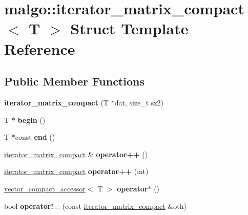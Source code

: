 \hypertarget{structmalgo_1_1iterator__matrix__compact}{}\section{malgo\+:\+:iterator\+\_\+matrix\+\_\+compact$<$ T $>$ Struct Template Reference}
\label{structmalgo_1_1iterator__matrix__compact}
\subsection*{Public Member Functions}
\begin{DoxyCompactItemize}
\item 
{\bfseries iterator\+\_\+matrix\+\_\+compact} (T $\ast$dat, size\+\_\+t sz2)\hypertarget{structmalgo_1_1iterator__matrix__compact_a6ecbcfb49db70543caf35c4c3c5786a9}{}\label{structmalgo_1_1iterator__matrix__compact_a6ecbcfb49db70543caf35c4c3c5786a9}

\item 
T $\ast$ {\bfseries begin} ()\hypertarget{structmalgo_1_1iterator__matrix__compact_af4232acbbc9790f3f0df8c0673c4f4dc}{}\label{structmalgo_1_1iterator__matrix__compact_af4232acbbc9790f3f0df8c0673c4f4dc}

\item 
T $\ast$const {\bfseries end} ()\hypertarget{structmalgo_1_1iterator__matrix__compact_ac4c395511c52cd471c2c17eddaa2f19f}{}\label{structmalgo_1_1iterator__matrix__compact_ac4c395511c52cd471c2c17eddaa2f19f}

\item 
\hyperlink{structmalgo_1_1iterator__matrix__compact}{iterator\+\_\+matrix\+\_\+compact} \& {\bfseries operator++} ()\hypertarget{structmalgo_1_1iterator__matrix__compact_aaa6c14c1501bd003315524564ced7c8c}{}\label{structmalgo_1_1iterator__matrix__compact_aaa6c14c1501bd003315524564ced7c8c}

\item 
\hyperlink{structmalgo_1_1iterator__matrix__compact}{iterator\+\_\+matrix\+\_\+compact} {\bfseries operator++} (int)\hypertarget{structmalgo_1_1iterator__matrix__compact_aeadd747858bf5975190be1d65510fdb7}{}\label{structmalgo_1_1iterator__matrix__compact_aeadd747858bf5975190be1d65510fdb7}

\item 
\hyperlink{classmalgo_1_1vector__compact__accessor}{vector\+\_\+compact\+\_\+accessor}$<$ T $>$ {\bfseries operator$\ast$} ()\hypertarget{structmalgo_1_1iterator__matrix__compact_a09a80325b2929e86e0768728fea579a6}{}\label{structmalgo_1_1iterator__matrix__compact_a09a80325b2929e86e0768728fea579a6}

\item 
bool {\bfseries operator!=} (const \hyperlink{structmalgo_1_1iterator__matrix__compact}{iterator\+\_\+matrix\+\_\+compact} \&oth)\hypertarget{structmalgo_1_1iterator__matrix__compact_adcd64d12b40d7c0de09329b6a0aafe46}{}\label{structmalgo_1_1iterator__matrix__compact_adcd64d12b40d7c0de09329b6a0aafe46}

\end{DoxyCompactItemize}
